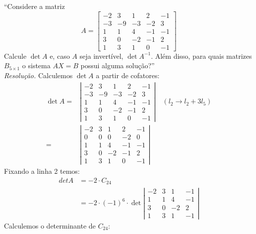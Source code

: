 \enquote{Considere a matriz
\begin{displaymath}
    A = \left[\begin{array}{ccccc}
         -2 & 3 & 1 & 2 & -1 \\
         -3 & -9 & -3 & -2 & 3 \\
         1 & 1 & 4 & -1 & -1 \\
         3 & 0 & -2 & -1 & 2 \\
         1 & 3 & 1 & 0 & -1
    \end{array}\right]
\end{displaymath}
Calcule $\det A$ e, caso $A$ seja invertível, $\det A^{-1}$. Além disso, para quais matrizes $B_{5\times1}$ o sistema $AX = B$ possui alguma solução?}
\\ \emph{Resolução.} Calculemos $\det A$ a partir de cofatores:
\begin{align*}
   \det A =& \left|\begin{array}{ccccc}
         -2 & 3 & 1 & 2 & -1 \\
         -3 & -9 & -3 & -2 & 3 \\
         1 & 1 & 4 & -1 & -1 \\
         3 & 0 & -2 & -1 & 2 \\
         1 & 3 & 1 & 0 & -1
    \end{array}\right| \quad (l_2 \rightarrow l_2 + 3l_5) \\
    =&\left|\begin{array}{ccccc}
         -2 & 3 & 1 & 2 & -1 \\
         0 & 0 & 0 & -2 & 0 \\
         1 & 1 & 4 & -1 & -1 \\
         3 & 0 & -2 & -1 & 2 \\
         1 & 3 & 1 & 0 & -1
    \end{array}\right|
\end{align*}
Fixando a linha 2 temos:
\begin{align*}
    det A &= -2 \cdot C_{24} \\ &= 
    -2 \cdot (-1)^{6} \cdot \det
    \left|\begin{array}{cccc}
         -2 & 3 & 1 & -1 \\
         1 & 1 & 4 & -1 \\
         3 & 0 & -2 & 2 \\
         1 & 3 & 1 & -1
    \end{array}\right|
\end{align*}
Calculemos o determinante de $C_{24}$:
